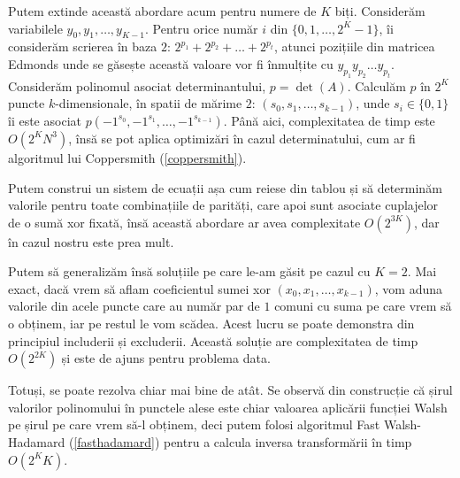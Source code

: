 Putem extinde această abordare acum pentru numere de $K$ biți. Considerăm variabilele $y_{0}, y_{1}, \ldots, y_{K-1}$.
Pentru orice număr $i$ din $\{0, 1, \ldots, 2^{K} - 1\}$, îi considerăm scrierea în baza $2$: $2^{p_{1}} + 2^{p_{2}} + \ldots + 2^{p_{t}}$,
atunci pozițiile din matricea Edmonds unde se găsește această valoare vor fi înmulțite cu $y_{p_{1}} y_{p_{2}} \ldots y_{p_{t}}$.
Considerăm polinomul asociat determinantului, $p = \det(A)$. Calculăm $p$ în $2^{K}$ puncte $k$-dimensionale, în spatii de mărime $2$:
$(s_{0}, s_{1}, \ldots, s_{k-1})$, unde $s_{i} \in \{0, 1\}$ îi este asociat $p(-1^{s_{0}}, -1^{s_{1}}, \ldots, -1^{s_{k-1}})$. Până aici,
complexitatea de timp este $O(2^{K}N^{3})$, însă se pot aplica optimizări în cazul determinatului, cum ar fi algoritmul lui Coppersmith
(\ref{coppersmith}).

Putem construi un sistem de ecuații așa cum reiese din tablou și să determinăm valorile pentru toate combinațiile de parități, care apoi
sunt asociate cuplajelor de o sumă xor fixată, însă această abordare ar avea complexitate $O(2^{3K})$, dar în cazul nostru este prea mult.

Putem să generalizăm însă soluțiile pe care le-am găsit pe cazul cu $K=2$. Mai exact, dacă vrem să aflam coeficientul sumei xor
$(x_{0}, x_{1}, \ldots, x_{k-1})$, vom aduna valorile din acele puncte care au număr par de $1$ comuni cu suma pe care vrem să o obținem,
iar pe restul le vom scădea. Acest lucru se poate demonstra din principiul includerii și excluderii. Această soluție are complexitatea de timp
$O(2^{2K})$ și este de ajuns pentru problema data.

Totuși, se poate rezolva chiar mai bine de atât. Se observă din construcție că șirul valorilor polinomului în punctele alese este chiar
valoarea aplicării funcției Walsh pe șirul pe care vrem să-l obținem, deci putem folosi algoritmul Fast Walsh-Hadamard
(\ref{fasthadamard}) pentru a calcula inversa transformării în timp $O(2^{K}K)$.
